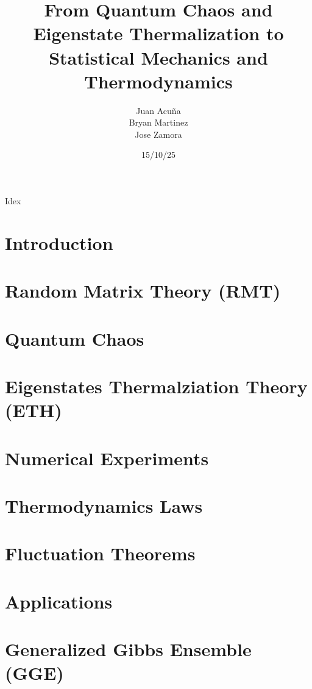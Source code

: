 \documentclass{beamer}
\title[ETH]{From Quantum Chaos and Eigenstate Thermalization to Statistical Mechanics and Thermodynamics}
\author{Juan Acuña \\ Bryan Martinez \\ Jose Zamora}
\institute{Universidad Distrital Francisco José de Caldas}
\date{15/10/25}
\begin{document}
\begin{frame}
    \titlepage
\end{frame}

\begin{frame}{Idex}
    \tableofcontents
\end{frame}

\section{Introduction}


\section{Random Matrix Theory (RMT)}


\section{Quantum Chaos}


\section{Eigenstates Thermalziation Theory (ETH)}


\section{Numerical Experiments}


\section{Thermodynamics Laws}


\section{Fluctuation Theorems}


\section{Applications}


\section{Generalized Gibbs Ensemble (GGE)}

\end{document}
